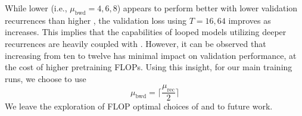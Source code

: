 While lower \meanbackward (i.e., $\mu_{\text{bwd}}=4,6,8$) appears to perform better with lower validation recurrences than higher \meanbackward, the validation loss using $T=16,64$ improves as \meanbackward increases. This implies that the capabilities of looped models utilizing deeper recurrences are heavily coupled with \meanbackward. However, it can be observed that increasing \meanbackward from ten to twelve has minimal impact on validation performance, at the cost of higher pretraining FLOPs. Using this insight, for our main training runs, we choose to use 
\begin{equation}
\mu_{\text{bwd}} = \lceil \frac{\mu_{\text{rec}}}{2} \rceil
\label{equation:mean-backward}
\end{equation}
We leave the exploration of FLOP optimal choices of \meanrecurrence and \meanbackward to future work.
